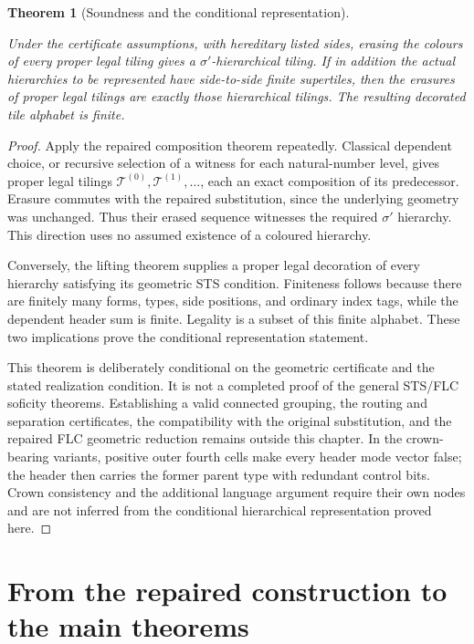 \documentclass[11pt,a4paper]{article}
\newtheorem{theorem}[definition]{Theorem}
\theoremstyle{remark}
\newcommand{\lean}[1]{}
\newcommand{\uses}[1]{}
\begin{document}
\begin{theorem}[Soundness and the conditional representation]
\label{thm:comp/soundness}
\lean{Tilings.Planned.projects_to_hierarchy}
\uses{thm:compose,lem:lift-hierarchy,def:hierarchy,def:certificate,def:hereditary}
Under the certificate assumptions, with hereditary listed sides, erasing
the colours of every proper
legal tiling gives a $\sigma'$-hierarchical tiling. If in addition the
actual hierarchies to be represented have side-to-side finite supertiles,
then the erasures of proper legal tilings are exactly those hierarchical
tilings. The resulting decorated tile alphabet is finite.
\end{theorem}
\begin{proof}
Apply the repaired composition theorem repeatedly. Classical dependent
choice, or recursive selection of a witness for each natural-number level,
gives proper legal tilings $\mathcal T^{(0)},\mathcal T^{(1)},\ldots$,
each an exact composition of its predecessor. Erasure commutes with the
repaired substitution, since the underlying geometry was unchanged.
Thus their erased sequence witnesses the required $\sigma'$ hierarchy.
This direction uses no assumed existence of a coloured hierarchy.

Conversely, the lifting theorem supplies a proper legal decoration of
every hierarchy satisfying its geometric STS condition. Finiteness follows
because there are finitely many forms, types, side positions, and ordinary
index tags, while the dependent header sum is finite. Legality is a subset
of this finite alphabet. These two implications prove the conditional
representation statement.

This theorem is deliberately conditional on the geometric certificate and
the stated realization condition. It is not a completed proof of the
general STS/FLC soficity theorems. Establishing a valid connected grouping,
the routing and separation certificates, the compatibility with the
original substitution, and the repaired FLC geometric reduction remains
outside this chapter. In the crown-bearing variants, positive outer
fourth cells make every header mode vector false; the header then carries
the former parent type with redundant control bits. Crown consistency and
the additional language argument require their own nodes and are not
inferred from the conditional hierarchical representation proved here.
\end{proof}

\section{From the repaired construction to the main theorems}
\end{document}
